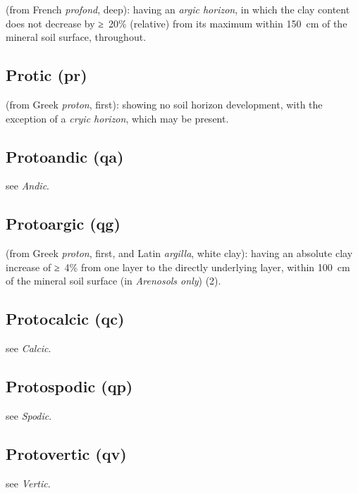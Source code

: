 \documentclass[
  letterpaper,
  DIV=11,
  numbers=noendperiod]{scrreprt}
\begin{document}
(from French \emph{profond}, deep): having an \emph{argic horizon}, in
which the clay content does not decrease by ≥~20\% (relative) from its
maximum within 150~cm of the mineral soil surface, throughout.

\hypertarget{protic-pr}{%
\subsection{Protic (pr)}\label{protic-pr}}

(from Greek \emph{proton}, first): showing no soil horizon development,
with the exception of a \emph{cryic horizon}, which may be present.

\hypertarget{protoandic-qa-1}{%
\subsection{Protoandic (qa)}\label{protoandic-qa-1}}

see \emph{Andic}.

\hypertarget{protoargic-qg}{%
\subsection{Protoargic (qg)}\label{protoargic-qg}}

(from Greek \emph{proton}, first, and Latin \emph{argilla}, white clay):
having an absolute clay increase of ≥~4\% from one layer to the directly
underlying layer, within 100~cm of the mineral soil surface (in
\emph{Arenosols only}) (2).

\hypertarget{protocalcic-qc-1}{%
\subsection{Protocalcic (qc)}\label{protocalcic-qc-1}}

see \emph{Calcic}.

\hypertarget{protospodic-qp}{%
\subsection{Protospodic (qp)}\label{protospodic-qp}}

see \emph{Spodic}.

\hypertarget{protovertic-qv}{%
\subsection{Protovertic (qv)}\label{protovertic-qv}}

see \emph{Vertic}.
\end{document}
